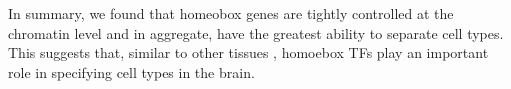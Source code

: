 In summary, we found that homeobox genes are tightly controlled at the chromatin level and in aggregate, have the greatest ability to separate cell types. This suggests that, similar to other tissues \citep{Kratsios_2017,Zheng_2015,Dasen_2009,Philippidou_2013}, homoebox TFs play an important role in specifying cell types in the brain.





